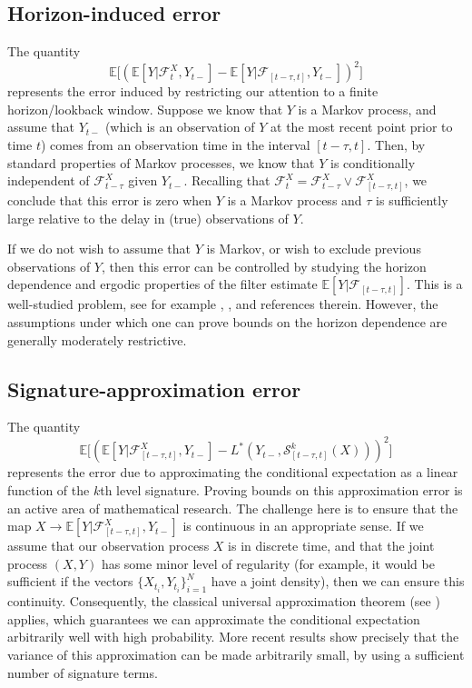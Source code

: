 \documentclass[a4paper, 12pt]{article}
\theoremstyle{remark}
\begin{document}
\subsection{Horizon-induced error} 
The quantity
\[ \mathbb{E}\Big[(\mathbb{E}[Y|\mathcal{F}_t^X, Y_{t-}] - \mathbb{E}[Y|\mathcal{F}_{[t-\tau, t]}, Y_{t-}])^2\Big]\]
represents the error induced by restricting our attention to a finite horizon/lookback window. Suppose we know that $Y$ is a Markov process, and assume that $Y_{t-}$ (which is an observation of $Y$ at the most recent point prior to time $t$) comes from an observation time in the interval $[t-\tau, t]$. Then, by standard properties of Markov processes, we know that $Y$ is conditionally independent of $\mathcal{F}^X_{t-\tau}$ given $Y_{t-}$. Recalling that $\mathcal{F}^X_t = \mathcal{F}_{t-\tau}^X \vee \mathcal{F}^X_{[t-\tau,t]}$, we conclude that this error is zero when $Y$ is a Markov process and $\tau$ is sufficiently large relative to the delay in (true) observations of $Y$.

If we do not wish to assume that $Y$ is Markov, or wish to exclude previous observations of $Y$, then this error can be controlled by studying the horizon dependence and ergodic properties of the filter estimate $\mathbb{E}[Y|\mathcal{F}_{[t-\tau, t]}]$. This is a well-studied problem, see for example \cite{vanHandel2014}, \cite{chigansky}, \cite{fausti} and references therein. However, the assumptions under which one can prove bounds on the horizon dependence are generally moderately restrictive.


\subsection{Signature-approximation error} 
The quantity
\[\mathbb{E}\Big[(\mathbb{E}[Y|\mathcal{F}^X_{[t-\tau, t]},  Y_{t-}] -L^*(Y_{t-},\mathcal{S}^k_{[t-\tau, t]}(X)) )^2\Big]\]
represents the error due to approximating the conditional expectation as a linear function of the $k$th level signature. Proving bounds on this approximation error is an active area of mathematical research. The challenge here is to ensure that the map $X \to \mathbb{E}[Y|\mathcal{F}^X_{[t-\tau, t]}, Y_{t-}]$ is continuous in an appropriate sense. If we assume that our observation process $X$ is in discrete time, and that the joint process $(X,Y)$ has some minor level of regularity (for example, it would be sufficient if the vectors $\{X_{t_i}, Y_{t_i}\}_{i=1}^N$ have a joint density), then we can ensure this continuity. Consequently, the classical universal approximation theorem (see \cite{levin2013learning}) applies, which guarantees we can approximate the conditional expectation arbitrarily well with high probability. More recent results \citep{cuchiero2025global, ceylanuniversality} show precisely that the variance of this approximation can be made arbitrarily small, by using a sufficient number of signature terms.
\end{document}
